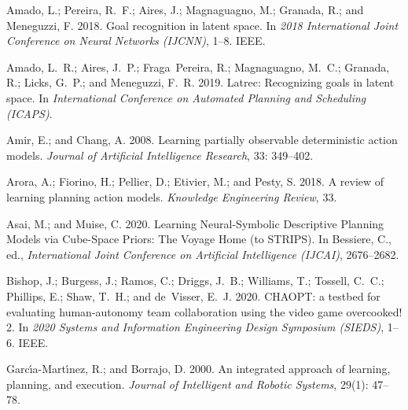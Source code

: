 \documentclass[letterpaper]{article} %
\begin{document}
%
%
\begin{thebibliography}{30}
\providecommand{\natexlab}[1]{#1}

Amado, L.; Pereira, R.~F.; Aires, J.; Magnaguagno, M.; Granada, R.; and
  Meneguzzi, F. 2018.
\newblock Goal recognition in latent space.
\newblock In \emph{2018 International Joint Conference on Neural Networks
  (IJCNN)}, 1--8. IEEE.

Amado, L.~R.; Aires, J.~P.; Fraga~Pereira, R.; Magnaguagno, M.~C.; Granada, R.;
  Licks, G.~P.; and Meneguzzi, F.~R. 2019.
\newblock Latrec: Recognizing goals in latent space.
\newblock In \emph{International Conference on Automated Planning and
  Scheduling (ICAPS)}.

Amir, E.; and Chang, A. 2008.
\newblock Learning partially observable deterministic action models.
\newblock \emph{Journal of Artificial Intelligence Research}, 33: 349--402.

Arora, A.; Fiorino, H.; Pellier, D.; Etivier, M.; and Pesty, S. 2018.
\newblock A review of learning planning action models.
\newblock \emph{Knowledge Engineering Review}, 33.

Asai, M.; and Muise, C. 2020.
\newblock Learning Neural-Symbolic Descriptive Planning Models via Cube-Space
  Priors: The Voyage Home (to {STRIPS)}.
\newblock In Bessiere, C., ed., \emph{International Joint Conference on
  Artificial Intelligence (IJCAI)}, 2676--2682.

Bishop, J.; Burgess, J.; Ramos, C.; Driggs, J.~B.; Williams, T.; Tossell,
  C.~C.; Phillips, E.; Shaw, T.~H.; and de~Visser, E.~J. 2020.
\newblock CHAOPT: a testbed for evaluating human-autonomy team collaboration
  using the video game overcooked! 2.
\newblock In \emph{2020 Systems and Information Engineering Design Symposium
  (SIEDS)}, 1--6. IEEE.

Garc{\'\i}a-Mart{\'\i}nez, R.; and Borrajo, D. 2000.
\newblock An integrated approach of learning, planning, and execution.
\newblock \emph{Journal of Intelligent and Robotic Systems}, 29(1): 47--78.


\end{thebibliography}
\end{document}
